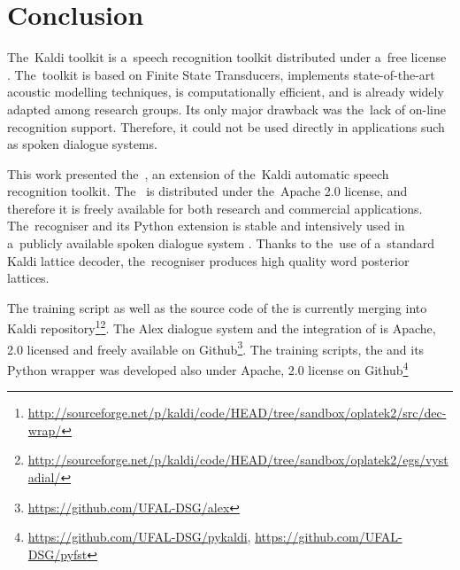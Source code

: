 \chapter{Conclusion}
\label{cha:conclusion}


The~Kaldi toolkit is a~speech recognition toolkit distributed under a~free license \cite{povey2011kaldi}.
The~toolkit is based on Finite State Transducers, implements state-of-the-art acoustic modelling techniques, is computationally efficient, and is already widely adapted among research groups.
Its only major drawback was the~lack of on-line recognition support.
Therefore, it could not be used directly in applications such as spoken dialogue systems.

This work presented the~, an extension of the~Kaldi automatic speech recognition toolkit.
The~ is distributed under the~Apache 2.0 license, and therefore it is freely available for both research and commercial applications.
The~recogniser and its Python extension is stable and intensively used in a~publicly available spoken dialogue system \cite{ptics2014url}.
Thanks to the~use of a~standard Kaldi lattice decoder, the~recogniser produces high quality word posterior lattices.


The training script as well as the source code of the  is currently merging into Kaldi repository\footnote{\url{http://sourceforge.net/p/kaldi/code/HEAD/tree/sandbox/oplatek2/src/dec-wrap/}}\footnote{\url{http://sourceforge.net/p/kaldi/code/HEAD/tree/sandbox/oplatek2/egs/vystadial/}}.
The Alex dialogue system and the integration of  is Apache, 2.0 licensed and freely available on Github\footnote{\url{https://github.com/UFAL-DSG/alex}}.
The training scripts, the  and its Python wrapper  was developed also under Apache, 2.0 license on Github\footnote{\url{https://github.com/UFAL-DSG/pykaldi}, \url{https://github.com/UFAL-DSG/pyfst}} 

